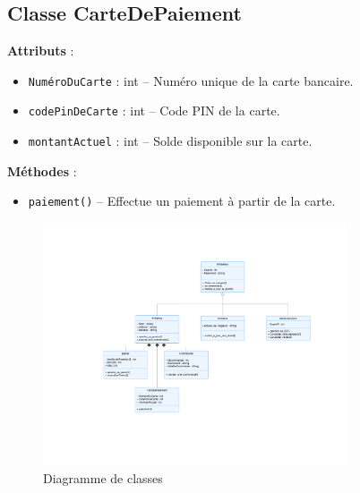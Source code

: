 \documentclass[a4paper,12pt]{article}
\begin{document}
\subsection{Classe CarteDePaiement}
\textbf{Attributs} :
\begin{itemize}
    \item \texttt{NuméroDuCarte} : int – Numéro unique de la carte bancaire.
    \item \texttt{codePinDeCarte} : int – Code PIN de la carte.
    \item \texttt{montantActuel} : int – Solde disponible sur la carte.
\end{itemize}
\textbf{Méthodes} :
\begin{itemize}
    \item \texttt{paiement()} – Effectue un paiement à partir de la carte.
\end{itemize}
\begin{figure}
    \centering
    \includegraphics[width=0.8\textwidth]{out/diagrammes/Diagramme_des_classes.pdf}
    \caption{Diagramme de classes}
\end{figure}

\clearpage
\end{document}
